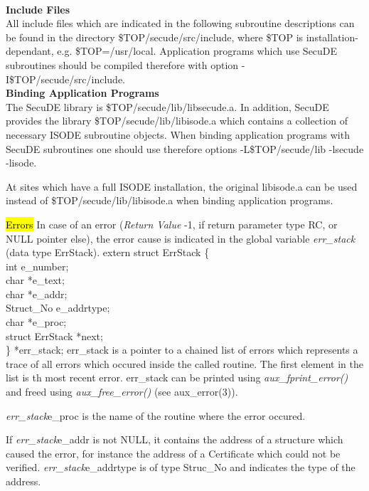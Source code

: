 \\ [1em]
{\bf Include Files}
\\ [1em]
All include files which are indicated in the following subroutine 
descriptions can be found
in the directory \$TOP/secude/src/include, where \$TOP is installation-
dependant, e.g. \$TOP=/usr/local.
Application programs which use SecuDE subroutines should be compiled 
therefore with
option -I\$TOP/secude/src/include.
\\ [1em]
{\bf Binding Application Programs}
\\ [1em]
The SecuDE library is \$TOP/secude/lib/libsecude.a. 
In addition, SecuDE provides the library \$TOP/secude/lib/libisode.a which 
contains a collection
of necessary ISODE subroutine objects. 
When binding application programs with SecuDE subroutines one should use 
therefore options
-L\$TOP/secude/lib -lsecude -lisode.  
 
At sites which have a full ISODE installation, the original libisode.a can 
be used 
instead of \$TOP/secude/lib/libisode.a when binding application programs.

\hl{Errors}
In case of an error ({\em Return Value} -1, if return parameter type  RC, 
or NULL pointer else),
the error cause is indicated in the global variable {\em err\_stack} (data 
type ErrStack).
\bvtab
\4 extern struct ErrStack \{                 \\
\5        int             \3 e\_number;      \\
\5        char            \3 *e\_text;       \\
\5        char            \3 *e\_addr;       \\
\5        Struct\_No      \3  e\_addrtype;   \\
\5        char	          \3 *e\_proc;       \\
\5        struct ErrStack \3 *next;	     \\
\4 \} *err\_stack;
\evtab
err\_stack is a pointer to a chained list of errors which represents a 
trace of all errors
which occured inside the called routine. The first element in the list is 
th most recent error.
err\_stack can be printed using {\em aux\_fprint\_error()} and freed using 
{\em aux\_free\_error()}
(see aux\_error(3)). 
 
{\em err\_stack}\pf e\_proc is the name of the routine where the error 
occured. 
 
If {\em err\_stack}\pf e\_addr is not NULL, it contains the address of a 
structure which caused
the error, for instance the address of a Certificate which could not be 
verified. 
{\em err\_stack}\pf e\_addrtype is of type Struc\_No and indicates the type 
of the address. 
 
